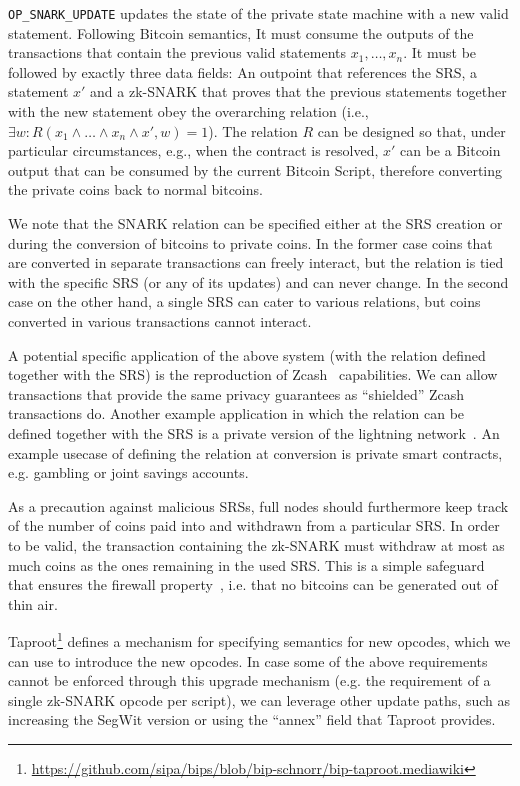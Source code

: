   \texttt{OP\_SNARK\_UPDATE} updates the state of the private state machine with
  a new valid statement. Following Bitcoin semantics, It must consume the
  outputs of the transactions that contain the previous valid statements $x_1,
  \dots, x_n$. It must be followed by exactly three data fields: An outpoint
  that references the SRS, a statement $x'$ and a zk-SNARK that proves that the
  previous statements together with the new statement obey the overarching
  relation (i.e., $\exists w: R(x_1 \wedge \dots \wedge x_n \wedge x', w) = 1$).
  The relation $R$ can be designed so that, under particular circumstances,
  e.g., when the contract is resolved, $x'$ can be a Bitcoin output that can be
  consumed by the current Bitcoin Script, therefore converting the private coins
  back to normal bitcoins.

  We note that the SNARK relation can be specified either at the SRS creation or
  during the conversion of bitcoins to private coins. In the former case coins
  that are converted in separate transactions can freely interact, but the
  relation is tied with the specific SRS (or any of its updates) and can never
  change. In the second case on the other hand, a single SRS can cater to
  various relations, but coins converted in various transactions cannot
  interact.

  A potential specific application of the above system (with the relation
  defined together with the SRS) is the reproduction of
  Zcash~\cite{DBLP:conf/sp/Ben-SassonCG0MTV14,zcash-protocol} capabilities. We
  can allow transactions that provide the same privacy guarantees as
  ``shielded'' Zcash transactions do. Another example application in which the
  relation can be defined together with the SRS is a private version of the
  lightning network~\cite{lightning}. An example usecase of defining the
  relation at conversion is private smart contracts, e.g. gambling or joint
  savings accounts.

  As a precaution against malicious SRSs, full nodes should furthermore keep
  track of the number of coins paid into and withdrawn from a particular SRS. In
  order to be valid, the transaction containing the zk-SNARK must withdraw at
  most as much coins as the ones remaining in the used SRS. This is a simple
  safeguard that ensures the firewall property~\cite{DBLP:conf/sp/GaziKZ19},
  i.e. that no bitcoins can be generated out of thin air.

  Taproot\footnote{\url{https://github.com/sipa/bips/blob/bip-schnorr/bip-taproot.mediawiki}}
  defines a mechanism for specifying semantics for new opcodes, which we can use
  to introduce the   new opcodes. In case some of the above requirements
  cannot be enforced through this upgrade mechanism (e.g. the requirement of a
  single zk-SNARK opcode per script), we can leverage other update paths, such
  as increasing the SegWit version or using the ``annex'' field that Taproot
  provides.

